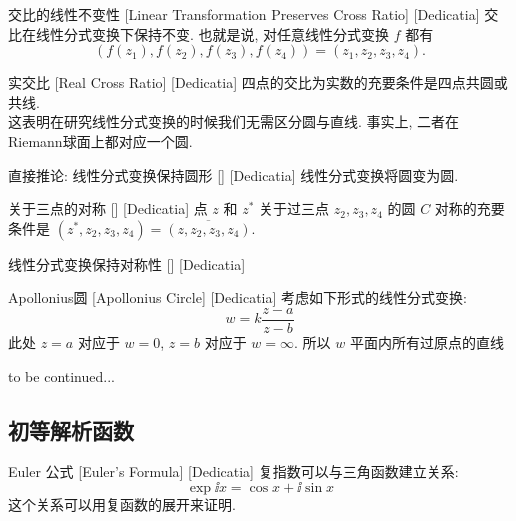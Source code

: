 \documentclass[UTF8]{ctexart}
\newcommand{\continued}{{\Large to be continued...}}
\begin{document}
        \begin{ppt}
            [UUID]
            {交比的线性不变性}
            [Linear Transformation Preserves Cross Ratio]
            [Dedicatia]
            交比在线性分式变换下保持不变. 也就是说, 对任意线性分式变换 \(f\) 都有
            \[(f(z_1),f(z_2),f(z_3),f(z_4))=(z_1,z_2,z_3,z_4).\]
        \end{ppt}

        \begin{ppt}
            [UUID]
            {实交比}
            [Real Cross Ratio]
            [Dedicatia]
            四点的交比为实数的充要条件是四点共圆或共线. \\
            这表明在研究线性分式变换的时候我们无需区分圆与直线. 事实上, 二者在Riemann球面上都对应一个圆. 
        \end{ppt}

        \begin{ppt}
            [UUID]
            {直接推论: 线性分式变换保持圆形}
            []
            [Dedicatia]
            线性分式变换将圆变为圆. 
        \end{ppt}
        
        \begin{ppt}
            [UUID]
            {关于三点的对称}
            []
            [Dedicatia]
            点 \(z\) 和 \(z^*\) 关于过三点 \(z_2,z_3,z_4\) 的圆 \(C\) 对称的充要条件是 \((z^*,z_2,z_3,z_4)=\overline{(z,z_2,z_3,z_4)}\).
        \end{ppt}

        \begin{ppt}
            [UUID]
            {线性分式变换保持对称性}
            []
            [Dedicatia]
        \end{ppt}

        \begin{dfn}
            [UUID]
            {Apollonius圆}
            [Apollonius Circle]
            [Dedicatia]
            考虑如下形式的线性分式变换: 
            \[w=k\frac{z-a}{z-b}\]
            此处 \(z=a\) 对应于 \(w=0\),  \(z=b\) 对应于 \(w=\infty\). 所以 \(w\) 平面内所有过原点的直线
        \end{dfn}

        \continued
    
    \subsection{初等解析函数}

        \begin{thm}
            [UUID]
            {Euler 公式}
            [Euler's Formula]
            [Dedicatia]
            复指数可以与三角函数建立关系: 
            \[\exp \ii x=\cos x+\ii\sin x\]
            这个关系可以用复函数的\PowerSeries 展开来证明. 
        \end{thm}
\end{document}
